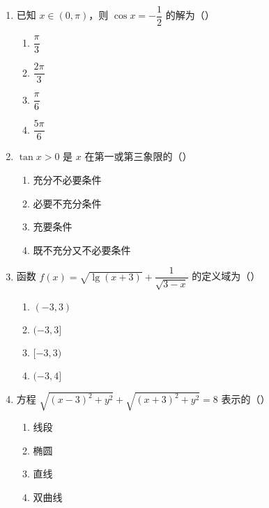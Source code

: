 \documentclass[12pt,a4paper]{ctexart}
\begin{document}
\begin{enumerate}
    \item 已知 $x \in (0,\pi)$，则 $\cos x = -\dfrac{1}{2}$ 的解为（）
    \begin{multicols}{2}
    \begin{enumerate}
        \item $\dfrac{\pi}{3}$
        \item $\dfrac{2\pi}{3}$
        \item $\dfrac{\pi}{6}$
        \item $\dfrac{5\pi}{6}$
    \end{enumerate}
    \end{multicols}

    \item $\tan x > 0$ 是 $x$ 在第一或第三象限的（）
    \begin{multicols}{2}
    \begin{enumerate}
        \item 充分不必要条件
        \item 必要不充分条件
        \item 充要条件
        \item 既不充分又不必要条件
    \end{enumerate}
    \end{multicols}

    \item 函数 $f(x)=\sqrt{\lg(x + 3)}+\dfrac{1}{\sqrt{3 - x}}$ 的定义域为（）
    \begin{multicols}{2}
    \begin{enumerate}
        \item $(-3,3)$
        \item $(-3,3]$
        \item $[-3,3)$
        \item $(-3,4]$
    \end{enumerate}
    \end{multicols}

    \item 方程 $\sqrt{(x - 3)^2 + y^2}+\sqrt{(x + 3)^2 + y^2}=8$ 表示的（）
    \begin{multicols}{2}
    \begin{enumerate}
        \item 线段
        \item 椭圆
        \item 直线
        \item 双曲线
    \end{enumerate}
    \end{multicols}


\end{enumerate}
\end{document}
